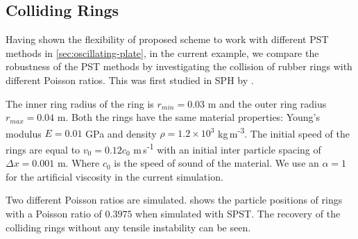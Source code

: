 %
%
\FloatBarrier%
\subsection{Colliding Rings}
\label{colliding-rings}

Having shown the flexibility of proposed scheme to work with different PST
methods in \cref{sec:oscillating-plate}, in the current example, we compare
the robustness of the PST methods by investigating the collision of rubber
rings with different Poisson ratios. This was first studied in SPH by
\cite{swegle1995smoothed}.

The inner ring radius of the ring is $r_{min} = 0.03$ m and the outer ring
radius $r_{max} = 0.04$ m. Both the rings have the same material properties:
Young's modulus $E = 0.01$ GPa and density $\rho = 1.2 \times 10^{3}$
 kg\,m\textsuperscript{-3}. The initial speed of the rings are equal to
$v_0 = 0.12 c_0$ m\,s\textsuperscript{-1} with an initial inter particle spacing of
$\Delta x = 0.001$ m. Where $c_0$ is the speed of sound of the material. We use
an $\alpha=1$ for the artificial viscosity in the current simulation.

Two different Poisson ratios are simulated. 
shows the particle positions of rings with a Poisson ratio of $0.3975$ when
simulated with SPST. The recovery of the colliding rings without any tensile
instability can be seen.

